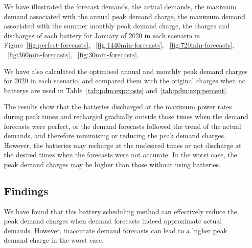 We have illustrated the forecast demands, the actual demands, the maximum demand associated with the annual peak demand charge, the maximum demand associated with the summer monthly peak demand charge, the charges and discharges of each battery for January of 2020 in each scenario in Figure~\ref{fig:perfect-forecasts}, ~\ref{fig:1440min-forecasts}, ~\ref{fig:720min-forecasts}, ~\ref{fig:360min-forecasts}, ~\ref{fig:30min-forecasts}.

 We have also calculated the optimised annual and monthly peak demand charges for 2020 in each scenario, and compared them with the original charges when no \glspl{battery} are used in Table~\ref{tab:pdm:exp:costs} and~\ref{tab:pdm:exp:percent}.

The results show that the batteries discharged at the maximum power rates during peak times and recharged gradually outside those times when the demand forecasts were perfect, or the demand forecasts followed the trend of the actual demands, and therefore minimising or reducing the peak demand charges. However, the batteries may recharge at the undesired times or not discharge at the desired times when the forecasts were not accurate. In the worst case, the peak demand charges may be higher than those without using batteries. 

\subsection{Findings}

We have found that this battery scheduling method can effectively reduce the peak demand charges when demand forecasts indeed approximate actual demands. However, inaccurate demand forecasts can lead to a higher peak demand charge in the worst case. 

